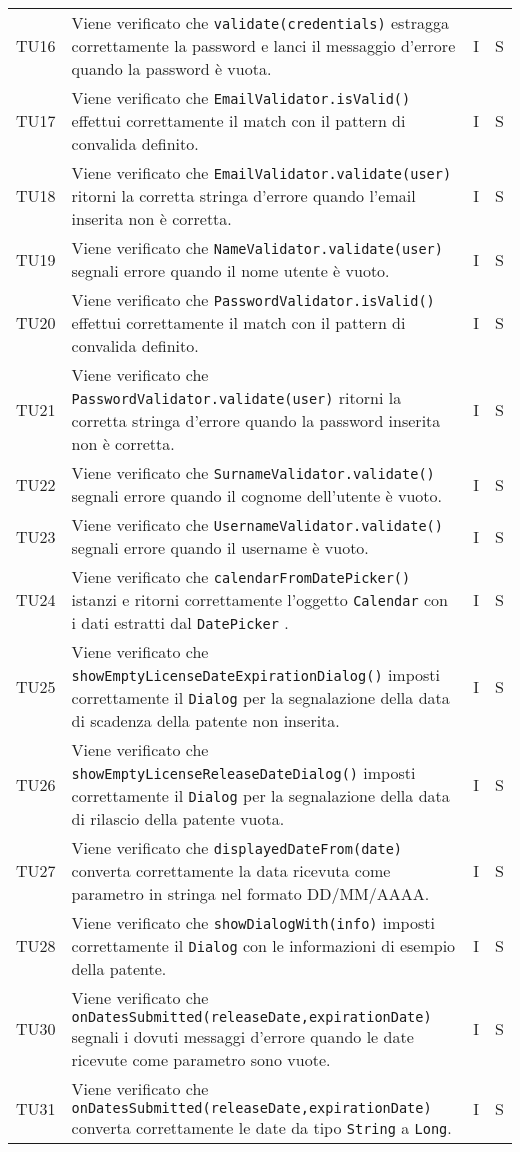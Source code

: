 \begin{longtable}{ >{\centering}p{}  >{\centering}p{} >{\centering}p{}
			>{\centering}p{}}
		\tabularnewline	
		TU16 & Viene verificato che \texttt{validate(credentials)} estragga correttamente la password e lanci il messaggio d'errore quando la password è vuota. & I & S
		\tabularnewline	
		TU17 & Viene verificato che \texttt{EmailValidator.isValid()} effettui correttamente il match con il pattern di convalida definito. & I & S
		\tabularnewline	
		TU18 & Viene verificato che \texttt{EmailValidator.validate(user)} ritorni la corretta stringa d'errore quando l'email inserita non è corretta. & I & S
		\tabularnewline	
		TU19 & Viene verificato che \texttt{NameValidator.validate(user)} segnali errore quando il nome utente è vuoto. & I & S
		\tabularnewline	
		TU20 & Viene verificato che \texttt{PasswordValidator.isValid()} effettui correttamente il match con il pattern di convalida definito. & I & S
		\tabularnewline	
		TU21 & Viene verificato che \texttt{PasswordValidator.validate(user)} ritorni la corretta stringa d'errore quando la password inserita non è corretta. & I & S
		\tabularnewline	
		TU22 & Viene verificato che \texttt{SurnameValidator.validate()} segnali errore quando il cognome dell'utente è vuoto. & I & S
		\tabularnewline	
		TU23 & Viene verificato che \texttt{UsernameValidator.validate()} segnali errore quando il username è vuoto. & I & S
		\tabularnewline	
		TU24 & Viene verificato che \texttt{calendarFromDatePicker()} istanzi e ritorni correttamente l'oggetto \texttt{Calendar} con i dati estratti dal \texttt{DatePicker} . & I & S
		\tabularnewline	
		TU25 & Viene verificato che \texttt{showEmptyLicenseDateExpirationDialog()} imposti correttamente il \texttt{Dialog} per la segnalazione della data di scadenza della patente non inserita. & I & S
		\tabularnewline	
		TU26 & Viene verificato che \texttt{showEmptyLicenseReleaseDateDialog()} imposti correttamente il \texttt{Dialog} per la segnalazione della data di rilascio della patente vuota. & I & S
		\tabularnewline	
		TU27 & Viene verificato che \texttt{displayedDateFrom(date)} converta correttamente la data ricevuta come parametro in stringa nel formato DD/MM/AAAA. & I & S
		\tabularnewline	
		TU28 & Viene verificato che \texttt{showDialogWith(info)} imposti correttamente il \texttt{Dialog} con le informazioni di esempio della patente. & I & S
		\tabularnewline	
		TU30 & Viene verificato che \texttt{onDatesSubmitted(releaseDate,expirationDate)} segnali i dovuti messaggi d'errore quando le date ricevute come parametro sono vuote. & I & S
		\tabularnewline	
		TU31 & Viene verificato che \texttt{onDatesSubmitted(releaseDate,expirationDate)} converta correttamente le date da tipo \texttt{String} a \texttt{Long}. & I & S

\end{longtable}
